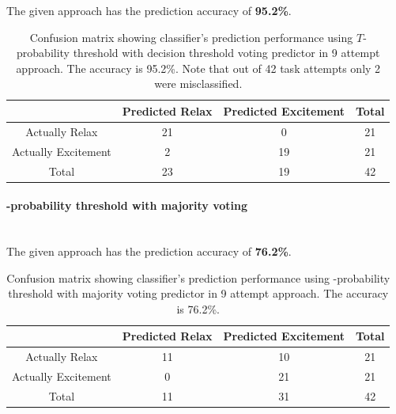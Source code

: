 \documentclass[12pt]{article}
\theoremstyle{definition}
\begin{document}
The given approach has the prediction accuracy of \textbf{95.2\%}.  
\begin{table}[H]
\begin{center}
  \begin{tabular}{ | c | c | c | c | }
    \hline
     & Predicted Relax & Predicted Excitement & Total \\ \hline
    Actually Relax & 21 & 0 & 21 \\ \hline
    Actually Excitement & 2 & 19 & 21 \\ \hline
    Total & 23 & 19 & 42 \\ 
    \hline
  \end{tabular}
\end{center}
\caption{Confusion matrix showing classifier's prediction performance using $T$-probability threshold with decision threshold voting predictor in 9 attempt approach. The accuracy is 95.2\%. Note that out of 42 task attempts only 2 were misclassified.}
\end{table}

\paragraph{-probability threshold with majority voting}~\\

The given approach has the prediction accuracy of \textbf{76.2\%}.  
\begin{table}[H]
\begin{center}
  \begin{tabular}{ | c | c | c | c | }
    \hline
     & Predicted Relax & Predicted Excitement & Total \\ \hline
    Actually Relax & 11 & 10 & 21 \\ \hline
    Actually Excitement & 0 & 21 & 21 \\ \hline
    Total & 11 & 31 & 42 \\ 
    \hline
  \end{tabular}
\end{center}
\caption{Confusion matrix showing classifier's prediction performance using -probability threshold with majority voting predictor in 9 attempt approach. The accuracy is 76.2\%.} 
\end{table}
\end{document}
